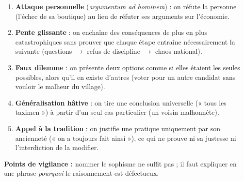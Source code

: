 \documentclass[11pt]{article}
\begin{document}
\begin{corrige}
\begin{enumerate}
\item \textbf{Attaque personnelle} (\emph{argumentum ad hominem}) : on réfute la personne (l'échec de sa boutique) au lieu de réfuter ses arguments sur l'économie.
\item \textbf{Pente glissante} : on enchaîne des conséquences de plus en plus catastrophiques sans prouver que chaque étape entraîne nécessairement la suivante (questions $\rightarrow$ refus de discipline $\rightarrow$ chaos national).
\item \textbf{Faux dilemme} : on présente deux options comme si elles étaient les seules possibles, alors qu'il en existe d'autres (voter pour un autre candidat sans vouloir le malheur du village).
\item \textbf{Généralisation hâtive} : on tire une conclusion universelle (« tous les taximen ») à partir d'un seul cas particulier (un voisin malhonnête).
\item \textbf{Appel à la tradition} : on justifie une pratique uniquement par son ancienneté (« on a toujours fait ainsi »), ce qui ne prouve ni sa justesse ni l'interdiction de la modifier.
\end{enumerate}
\textbf{Points de vigilance :} nommer le sophisme ne suffit pas ; il faut expliquer en une phrase \emph{pourquoi} le raisonnement est défectueux.
\end{corrige}
\end{document}
